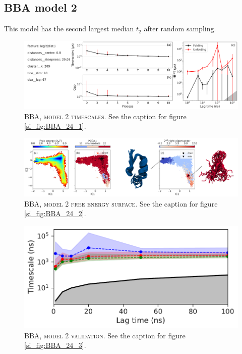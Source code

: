 \documentclass{article}
\begin{document}
\FloatBarrier
\clearpage


\subsection{BBA model 2}

This model has the second largest median $t_{2}$ after random sampling. 

\begin{figure}[h]
    \centering
    \includegraphics[width=\columnwidth]{SI_figures/BBA_124_SI-1.pdf}
    \caption{\textsc{BBA, model 2 timescales}. See the caption for figure \ref{si_fig:BBA_24_1}.}
    \label{si_fig:BBA_000_1}
\end{figure}

\begin{figure}[h]
    \centering
    \includegraphics[width=\columnwidth]{SI_figures/BBA_124_SI-2.png}
    \caption{\textsc{BBA,  model 2 free energy surface}. See the caption for figure \ref{si_fig:BBA_24_2}.}
    \label{si_fig:BBA_000_2}
\end{figure}

\begin{figure}[h]
    \centering
    \includegraphics[height=0.15\textheight]{SI_figures/BBA_124_its.pdf}
    \caption{\textsc{BBA, model 2 validation}. See the caption for  figure \ref{si_fig:BBA_24_3}.}
    \label{si_fig:BBA_000_3}
\end{figure}
\end{document}
